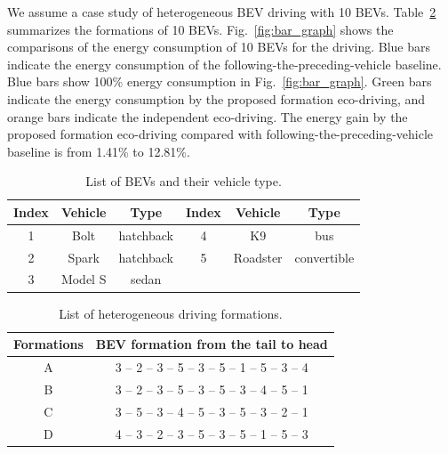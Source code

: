\documentclass{IEEEtran}
\begin{document}
We assume a case study of heterogeneous BEV driving with 10 BEVs. Table~\ref{table:list_formation} summarizes the formations of 10 BEVs. 
Fig.~\ref{fig:bar_graph} shows the comparisons of the energy consumption of 10 BEVs for the driving. Blue bars indicate the energy consumption of the  following-the-preceding-vehicle baseline. Blue bars show 100\% energy consumption in Fig.~\ref{fig:bar_graph}. Green bars indicate the energy consumption by the proposed formation eco-driving, and orange bars indicate the independent eco-driving.
The energy gain by the proposed formation eco-driving compared with following-the-preceding-vehicle baseline is from 1.41\% to 12.81\%. 


\begin{table} 	%
\centering
\small
\caption{List of BEVs and their vehicle type.}
\label{table:list_EVs}
\begin{tabular}{|c|c|c|c|c|c|} \hline
Index	&Vehicle	&Type		&Index	&Vehicle	&Type 	\\ \hline
1		&Bolt	&hatchback	&4		&K9		&bus			\\ \hline	
2		&Spark	&hatchback	&5		&Roadster&convertible 	\\ \hline
3		&Model S	&sedan	\\ \cline{1-3}
\end{tabular}
\end{table}



\begin{table} 	%
\centering
\small
\caption{List of heterogeneous driving formations.}
\label{table:list_formation}
\begin{tabular}{|c|c|} \hline
Formations	& BEV formation from the tail to head	\\ \hline
A	&3 -- 2 -- 3 -- 5 -- 3 -- 5 -- 1 -- 5 -- 3 -- 4	\\ \hline
B	&3 -- 2 -- 3 -- 5 -- 3 -- 5 -- 3 -- 4 -- 5 -- 1	\\ \hline
C	&3 -- 5 -- 3 -- 4 -- 5 -- 3 -- 5 -- 3 -- 2 -- 1	\\ \hline
D	&4 -- 3 -- 2 -- 3 -- 5 -- 3 -- 5 -- 1 -- 5 -- 3	\\ \hline
\end{tabular}
\end{table}
\end{document}
